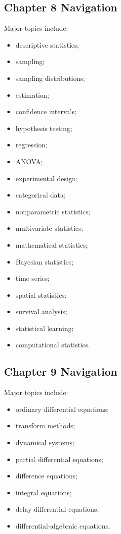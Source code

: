 \subsection{Chapter 8 Navigation}
\label{subsec:index-chapter-eight}

Major topics include:

\begin{itemize}
    \item descriptive statistics;
    \item sampling;
    \item sampling distributions;
    \item estimation;
    \item confidence intervals;
    \item hypothesis testing;
    \item regression;
    \item ANOVA;
    \item experimental design;
    \item categorical data;
    \item nonparametric statistics;
    \item multivariate statistics;
    \item mathematical statistics;
    \item Bayesian statistics;
    \item time series;
    \item spatial statistics;
    \item survival analysis;
    \item statistical learning;
    \item computational statistics.
\end{itemize}

\subsection{Chapter 9 Navigation}
\label{subsec:index-chapter-nine}

Major topics include:

\begin{itemize}
    \item ordinary differential equations;
    \item transform methods;
    \item dynamical systems;
    \item partial differential equations;
    \item difference equations;
    \item integral equations;
    \item delay differential equations;
    \item differential-algebraic equations.
\end{itemize}


